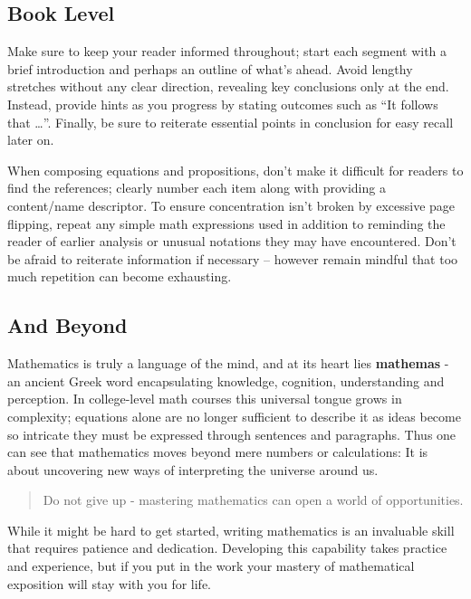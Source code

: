 \documentclass[
  twoside,
  12pt,
  letterpaper,
  fleqn]{article}
\begin{document}
\hypertarget{book-level}{%
\subsection{Book Level}\label{book-level}}

Make sure to keep your reader informed throughout; start each segment
with a brief introduction and perhaps an outline of what's ahead. Avoid
lengthy stretches without any clear direction, revealing key conclusions
only at the end. Instead, provide hints as you progress by stating
outcomes such as ``It follows that \ldots{}''. Finally, be sure to
reiterate essential points in conclusion for easy recall later on.

When composing equations and propositions, don't make it difficult for
readers to find the references; clearly number each item along with
providing a content/name descriptor. To ensure concentration isn't
broken by excessive page flipping, repeat any simple math expressions
used in addition to reminding the reader of earlier analysis or unusual
notations they may have encountered. Don't be afraid to reiterate
information if necessary -- however remain mindful that too much
repetition can become exhausting.

\hypertarget{and-beyond}{%
\subsection{And Beyond}\label{and-beyond}}

Mathematics is truly a language of the mind, and at its heart lies
\textbf{mathemas} - an ancient Greek word encapsulating knowledge,
cognition, understanding and perception. In college-level math courses
this universal tongue grows in complexity; equations alone are no longer
sufficient to describe it as ideas become so intricate they must be
expressed through sentences and paragraphs. Thus one can see that
mathematics moves beyond mere numbers or calculations: It is about
uncovering new ways of interpreting the universe around us.

\begin{quote}
Do not give up - mastering mathematics can open a world of
opportunities.
\end{quote}

While it might be hard to get started, writing mathematics is an
invaluable skill that requires patience and dedication. Developing this
capability takes practice and experience, but if you put in the work
your mastery of mathematical exposition will stay with you for life.


\printbibliography



\thispagestyle{empty}
\end{document}
